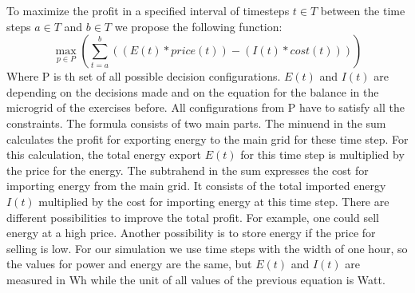 To maximize the profit in a specified interval of timesteps $t \in T$ between the time steps $a \in T$ and $b \in T$ we propose the following function:\\
\begin{equation} \label{eq:opt}
\max_{p \in P}{(\sum_{t=a}^{b}{((E(t)*price(t))-(I(t)*cost(t)))})}
\end{equation}
Where P is th set of all possible decision configurations. $E(t)$ and $I(t)$ are depending on the decisions made and on the equation for the balance in the microgrid of the exercises before. All configurations from P have to satisfy all the constraints. The formula consists of two main parts. The minuend in the sum calculates the profit for exporting energy to the main grid for these time step. For this calculation, the total energy export $E(t)$ for this time step is multiplied by the price for the energy. The subtrahend in the sum expresses the cost for importing energy from the main grid. It consists of the total imported energy $I(t)$ multiplied by the cost for importing energy at this time step. There are different possibilities to improve the total profit. For example, one could sell energy at a high price. Another possibility is to store energy if the price for selling is low. For our simulation we use time steps with the width of one hour, so the values for power and energy are the same, but $E(t)$ and $I(t)$ are measured in Wh while the unit of all values of the previous equation is Watt.

